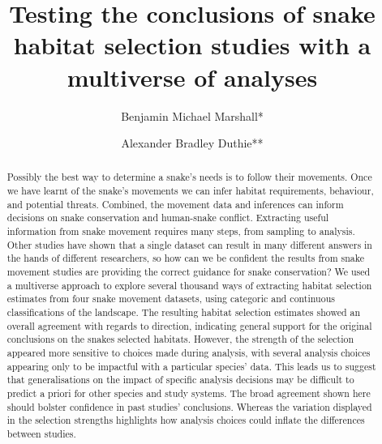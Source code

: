 \documentclass[10pt,a4paper]{article}
\begin{document}
\pagestyle{fancy}

\title{Testing the conclusions of snake habitat selection studies with a multiverse of analyses}
\author[1]{Benjamin Michael Marshall*}
\author[1]{Alexander Bradley Duthie**}


\maketitle
\thispagestyle{fancy}

\begin{abstract}

Possibly the best way to determine a snake's needs is to follow their movements. Once we have learnt of the snake's movements we can infer habitat requirements, behaviour, and potential threats. Combined, the movement data and inferences can inform decisions on snake conservation and human-snake conflict. Extracting useful information from snake movement requires many steps, from sampling to analysis. Other studies have shown that a single dataset can result in many different answers in the hands of different researchers, so how can we be confident the results from snake movement studies are providing the correct guidance for snake conservation? We used a multiverse approach to explore several thousand ways of extracting habitat selection estimates from four snake movement datasets, using categoric and continuous classifications of the landscape. The resulting habitat selection estimates showed an overall agreement with regards to direction, indicating general support for the original conclusions on the snakes selected habitats. However, the strength of the selection appeared more sensitive to choices made during analysis, with several analysis choices appearing only to be impactful with a particular species' data. This leads us to suggest that generalisations on the impact of specific analysis decisions may be difficult to predict a priori for other species and study systems. The broad agreement shown here should bolster confidence in past studies' conclusions. Whereas the variation displayed in the selection strengths highlights how analysis choices could inflate the differences between studies.

\end{abstract}
\end{document}
